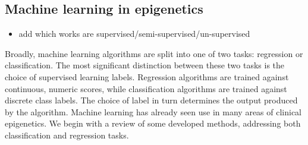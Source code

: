 \documentclass{article}
\begin{document}


\subsection{Machine learning in epigenetics}
\begin{itemize}
    \item add which works are supervised/semi-supervised/un-supervised
\end{itemize}

Broadly, machine learning algorithms are split into one of two tasks: regression or classification. The most significant distinction between these two tasks is the choice of supervised learning labels. Regression algorithms are trained against continuous, numeric scores, while classification algorithms are trained against discrete class labels. The choice of label in turn determines the output produced by the algorithm.
Machine learning has already seen use in many areas of clinical epigenetics. We begin with a review of some developed methods, addressing both classification and regression tasks.
\end{document}

